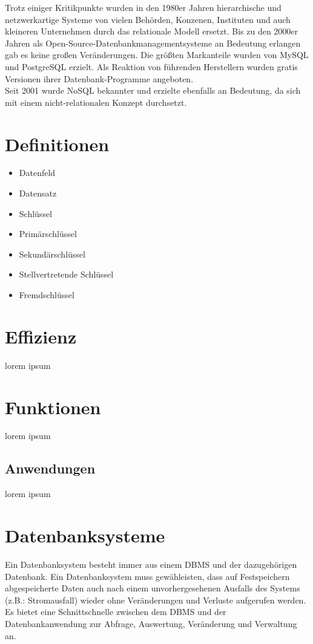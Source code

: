 \documentclass[11pt,a4paper]{report}
\begin{document}
Trotz einiger Kritikpunkte wurden in den 1980er Jahren hierarchische und netzwerkartige Systeme von vielen Behörden, Konzenen, Instituten und auch kleineren Unternehmen durch das relationale Modell ersetzt. Bis zu den 2000er Jahren als Open-Source-Datenbankmanagementsysteme an Bedeutung erlangen gab es keine großen Veränderungen. Die größten Markanteile wurden von MySQL und PostgreSQL erzielt.
Als Reaktion von führenden Herstellern wurden gratis Versionen ihrer Datenbank-Programme angeboten.\\

Seit 2001 wurde  NoSQL bekannter und erzielte ebenfalls an Bedeutung, da sich mit einem nicht-relationalen Konzept durchsetzt.
\section{Definitionen}
\begin{itemize}
\item Datenfeld
\item Datensatz
\item Schlüssel
\item Primärschlüssel
\item Sekundärschlüssel
\item Stellvertretende Schlüssel
\item Fremdschlüssel

\end{itemize}
\section{Effizienz}
lorem ipsum
\section{Funktionen}
lorem ipsum
\subsection{Anwendungen}
lorem ipsum
\section{Datenbanksysteme}
Ein Datenbanksystem besteht immer aus einem DBMS und der dazugehörigen Datenbank. Ein Datenbanksystem muss gewähleisten, dass auf Festspeichern abgespeicherte Daten auch nach einem unvorhergesehenen Ausfalls des Systems (z.B.: Stromausfall) wieder ohne Veränderungen und Verluste aufgerufen werden.\\
Es bietet eine Schnittschnelle zwischen dem DBMS und der Datenbankanwendung zur  Abfrage, Auswertung, Veränderung und Verwaltung an.
\end{document}
